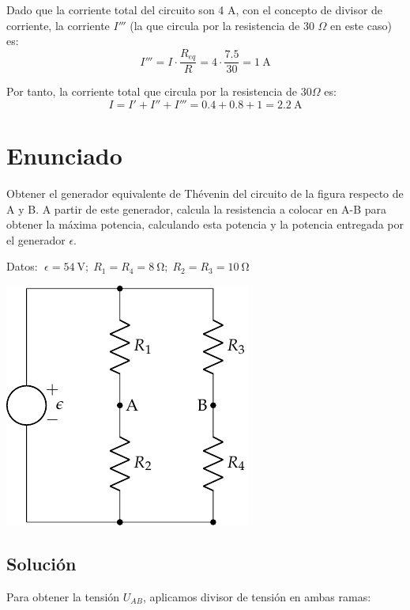 Dado que la corriente total del circuito son 4 A, con el concepto de
divisor de corriente, la corriente $I'''$ (la que circula por la
resistencia de 30 $\Omega$ en este caso) es:
\begin{equation*}
  I'''=I\cdot \dfrac{R_{eq}}{R}=4\cdot\dfrac{7.5}{30}=\qty{1}{\ampere}
\end{equation*}

Por tanto, la corriente total que circula por la resistencia de
$30\Omega$ es:
\begin{equation*}
  I=I'+I''+I'''=0.4+0.8+1=\qty{2.2}{\ampere}
\end{equation*}

\section{Enunciado}
Obtener el generador equivalente de Thévenin del circuito de la figura
respecto de A y B. A partir de este generador, calcula la resistencia
a colocar en A-B para obtener la máxima potencia, calculando esta
potencia y la potencia entregada por el generador $\epsilon$.

\vspace{2mm}
Datos:
$\; \epsilon = \qty{54}{\volt};\; R_1 = R_4 = \qty{8}{\ohm};\; R_2
= R_3 = \qty{10}{\ohm}$

\begin{center}
  \includegraphics{figuras/Thevenin2}
\end{center}

    
\subsection*{Solución}
Para obtener la tensión $U_{AB}$, aplicamos divisor de tensión en ambas ramas:

